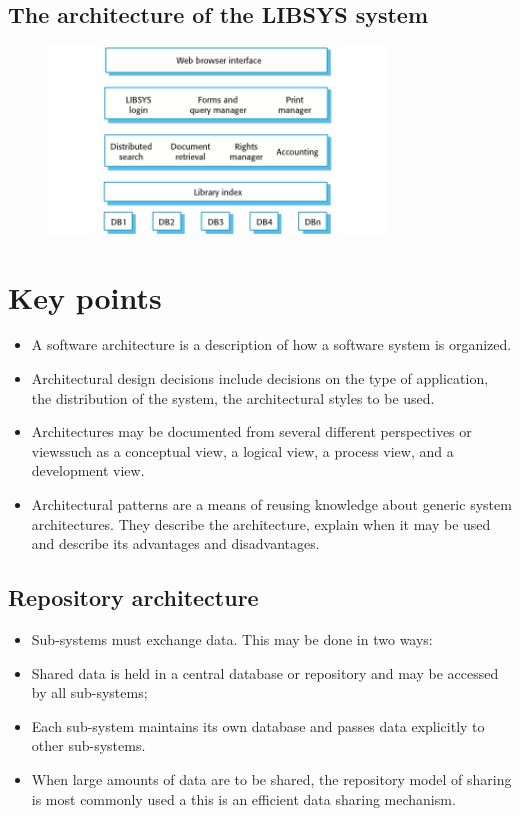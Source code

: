 \subsection{The architecture of the LIBSYS system}
\begin{figure}[h!]
    \centering
    \includegraphics[width = 0.8\textwidth]{./figures/L3_5.png}
    \caption{}
    \label{fig:L3_5}
\end{figure}

\section{Key points}
\begin{itemize}

\item A software architecture is a description of how a software system is organized.

\item Architectural design decisions include decisions on the type of application, the distribution of the system, the architectural styles to be used.

\item Architectures may be documented from several different perspectives or viewssuch as a conceptual view, a logical view, a process view, and a development view.

\item Architectural patterns are a means of reusing knowledge about generic system architectures. They describe the architecture, explain when it may be used and describe its advantages and disadvantages.


\end{itemize}
\subsection{Repository architecture}
\begin{itemize}
\item Sub-systems must exchange data. This may be done in two ways:

 \item Shared data is held in a central database or repository and may be accessed by all sub-systems;
 \item Each sub-system maintains its own database and passes data explicitly to other sub-systems.

\item When large amounts of data are to be shared, the repository model of sharing is most commonly used a this is an efficient data sharing mechanism.


\end{itemize}
